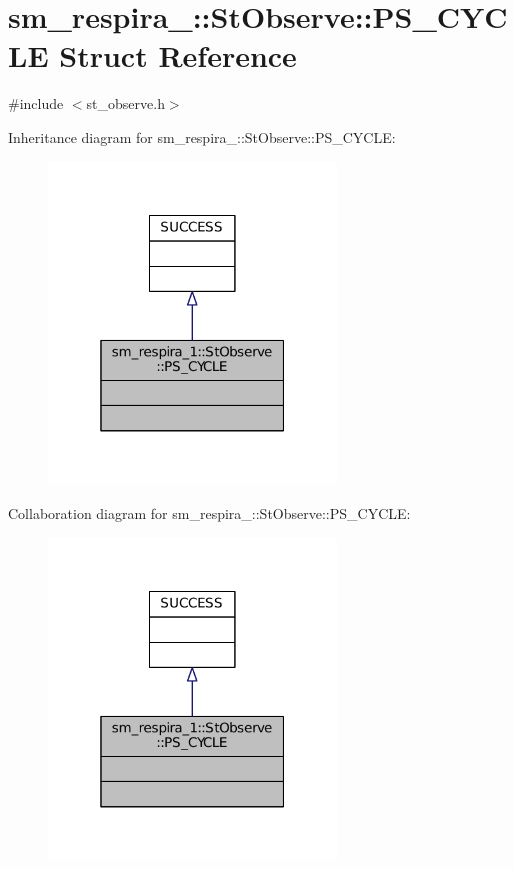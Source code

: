 \hypertarget{structsm__respira__1_1_1StObserve_1_1PS__CYCLE}{}\section{sm\+\_\+respira\+\_\+:\+:St\+Observe\+:\+:P\+S\+\_\+\+C\+Y\+C\+LE Struct Reference}
\label{structsm__respira__1_1_1StObserve_1_1PS__CYCLE}


{\ttfamily \#include $<$st\+\_\+observe.\+h$>$}



Inheritance diagram for sm\+\_\+respira\+\_\+:\+:St\+Observe\+:\+:P\+S\+\_\+\+C\+Y\+C\+LE\+:
\nopagebreak
\begin{figure}[H]
\begin{center}
\leavevmode
\includegraphics[width=217pt]{structsm__respira__1_1_1StObserve_1_1PS__CYCLE__inherit__graph}
\end{center}
\end{figure}


Collaboration diagram for sm\+\_\+respira\+\_\+:\+:St\+Observe\+:\+:P\+S\+\_\+\+C\+Y\+C\+LE\+:
\nopagebreak
\begin{figure}[H]
\begin{center}
\leavevmode
\includegraphics[width=217pt]{structsm__respira__1_1_1StObserve_1_1PS__CYCLE__coll__graph}
\end{center}
\end{figure}


